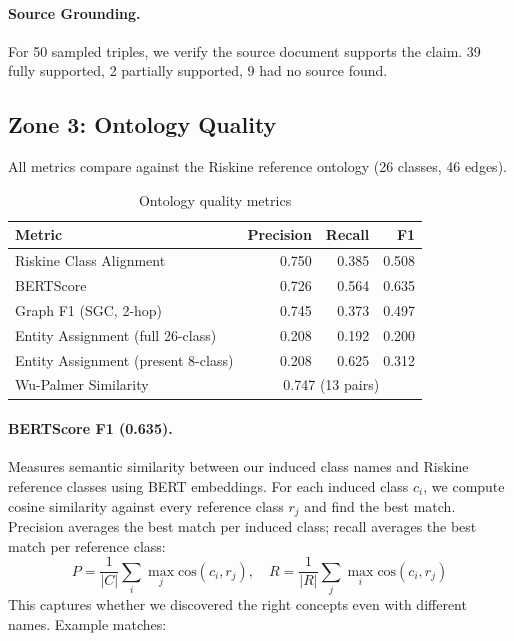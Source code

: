 \documentclass[11pt]{article}
\begin{document}
\paragraph{Source Grounding.}
For 50 sampled triples, we verify the source document supports the claim. 39 fully supported, 2 partially supported, 9 had no source found.

\subsection{Zone 3: Ontology Quality}

All metrics compare against the Riskine reference ontology (26 classes, 46 edges).

\begin{table}[h]
\centering
\caption{Ontology quality metrics}
\begin{tabular}{lrrr}
\toprule
\textbf{Metric} & \textbf{Precision} & \textbf{Recall} & \textbf{F1} \\
\midrule
Riskine Class Alignment & 0.750 & 0.385 & 0.508 \\
BERTScore & 0.726 & 0.564 & 0.635 \\
Graph F1 (SGC, 2-hop) & 0.745 & 0.373 & 0.497 \\
Entity Assignment (full 26-class) & 0.208 & 0.192 & 0.200 \\
Entity Assignment (present 8-class) & 0.208 & 0.625 & 0.312 \\
\midrule
Wu-Palmer Similarity & \multicolumn{3}{c}{0.747 (13 pairs)} \\
\bottomrule
\end{tabular}
\end{table}

\paragraph{BERTScore F1 (0.635).}
Measures semantic similarity between our induced class names and Riskine reference classes using BERT embeddings. For each induced class $c_i$, we compute cosine similarity against every reference class $r_j$ and find the best match. Precision averages the best match per induced class; recall averages the best match per reference class:
\[
P = \frac{1}{|C|}\sum_{i} \max_j \text{cos}(c_i, r_j), \quad R = \frac{1}{|R|}\sum_{j} \max_i \text{cos}(c_i, r_j)
\]
This captures whether we discovered the right concepts even with different names. Example matches:
\end{document}
